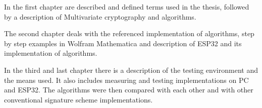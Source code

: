 \documentclass[thesis=M,english]{FITthesis}[2019/12/23]
\begin{document}
\bigskip
\noindent
In the first chapter are described and defined terms used in the thesis, followed by a description of Multivariate cryptography and algorithms.

\bigskip
\noindent
The second chapter deals with the referenced implementation of algorithms, step by step examples in Wolfram Mathematica and description of ESP32 and its implementation of algorithms.

\bigskip
\noindent
In the third and last chapter there is a description of the testing environment and the means used. It also includes measuring and testing implementations on PC and ESP32. The algorithms were then compared with each other and with other conventional signature scheme implementations.



\end{document}
